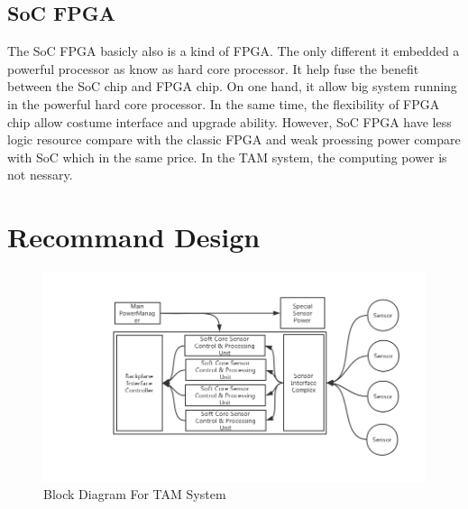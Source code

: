 \documentclass[12pt,article]{memoir}
\begin{document}
\section{SoC FPGA}
The SoC FPGA basicly also is a kind of FPGA. The only different it embedded a powerful processor as know as hard core processor. It help fuse the benefit between the SoC chip and FPGA chip. On one hand, it allow big system running in the powerful hard core processor. In the same time, the flexibility of FPGA chip allow costume interface and upgrade ability. However, SoC FPGA have less logic resource compare with the classic FPGA and weak proessing power compare with SoC which in the same price. In the TAM system, the computing power is not nessary.
\newpage
\chapter{Recommand Design}
\begin{figure}[htp]
\begin{center}
\includegraphics[width=\textwidth]{img/DR00004_FPGA.png}
 \caption{Block Diagram For TAM System}	
\end{center}
\end{figure}
\end{document}
